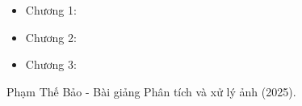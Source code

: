 \documentclass[12pt,a4paper]{report}
\numberwithin{equation}{section}
\theoremstyle{definition} %
\begin{document}
	\begin{itemize}
	\item Chương 1:
	

	
	\item Chương 2:

	
	\item Chương 3: 
	

	
	\end{itemize}
	
	\begin{thebibliography}{99}
		\thispagestyle{fancy}
		
		
		
		

		
		 Phạm Thế Bảo - Bài giảng Phân tích và xử lý ảnh (2025).
		
		
		
		
		
		
		
		
	\end{thebibliography}
	
	\newpage %
	
	\thispagestyle{empty} %

	\mbox{}
\end{document}
